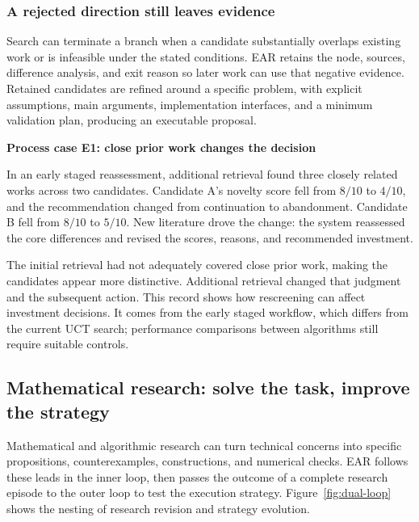 \subsubsection{A rejected direction still leaves evidence}
Search can terminate a branch when a candidate substantially overlaps existing work or is infeasible under the stated conditions. EAR retains the node, sources, difference analysis, and exit reason so later work can use that negative evidence. Retained candidates are refined around a specific problem, with explicit assumptions, main arguments, implementation interfaces, and a minimum validation plan, producing an executable proposal.

\begin{insight}
\textbf{Process case E1: close prior work changes the decision}\par
In an early staged reassessment, additional retrieval found three closely related works across two candidates. Candidate A's novelty score fell from $8/10$ to $4/10$, and the recommendation changed from continuation to abandonment. Candidate B fell from $8/10$ to $5/10$. New literature drove the change: the system reassessed the core differences and revised the scores, reasons, and recommended investment.
\end{insight}

The initial retrieval had not adequately covered close prior work, making the candidates appear more distinctive. Additional retrieval changed that judgment and the subsequent action. This record shows how rescreening can affect investment decisions. It comes from the early staged workflow, which differs from the current UCT search; performance comparisons between algorithms still require suitable controls.

\FloatBarrier
\subsection{Mathematical research: solve the task, improve the strategy}
\label{sec:math}
Mathematical and algorithmic research can turn technical concerns into specific propositions, counterexamples, constructions, and numerical checks. EAR follows these leads in the inner loop, then passes the outcome of a complete research episode to the outer loop to test the execution strategy. Figure~\ref{fig:dual-loop} shows the nesting of research revision and strategy evolution.



